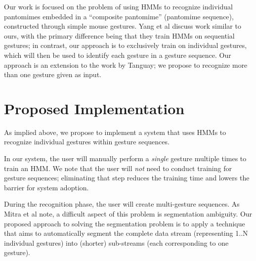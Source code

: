 \documentclass[twoside]{article}
\begin{document}
\begin{multicols}{2}
Our work is focused on the problem of using HMMs to
recognize individual pantomimes embedded in a ``composite pantomime'' (pantomime
sequence), constructed through simple mouse gestures. %
Yang et al \cite{yang_gesture_1994} discuss work similar to ours, with the primary 
difference being that they train HMMs on sequential gestures; in contrast, our approach 
is to exclusively train on individual gestures, which will then be used to identify 
each gesture in a gesture sequence. %
Our approach is an extension 
to the work by Tanguay\cite{tanguay_jr_hidden_1995}; we propose to recognize 
more than one gesture given as input.

\begin{comment}
His work differs from ours primarily by focusing exclusively on gesture
recognition of individual gestures.
\end{comment}

\section{Proposed Implementation}

As implied above, we propose to implement a system that uses HMMs 
to recognize individual gestures within gesture sequences.
\begin{comment}
Consistent with the related work described above, the user will first perform a
training phase and subsequently use the system during a recognition phase. 
\end{comment}
In our system, the user will manually perform a \emph{single} gesture multiple times to
train an HMM. We note that the user will \emph{not} need to conduct training for
gesture sequences; eliminating that step reduces the training time and lowers
the barrier for system adoption.

During the recognition phase, the user will create multi-gesture sequences.
As Mitra et al note, %
a difficult aspect of this problem is segmentation ambiguity. Our proposed approach to solving the
segmentation problem is to apply a technique that aims to automatically segment
the complete data stream (representing 1..N individual gestures) into (shorter)
sub-streams (each corresponding to one gesture).
\begin{comment}
An initial segmentation step consists of splitting the complete data stream up
into N sub-streams (each corresponding to an individual gesture) with a duration
equal to the average duration of the training gestures.
\end{comment}


\end{multicols}
\end{document}
